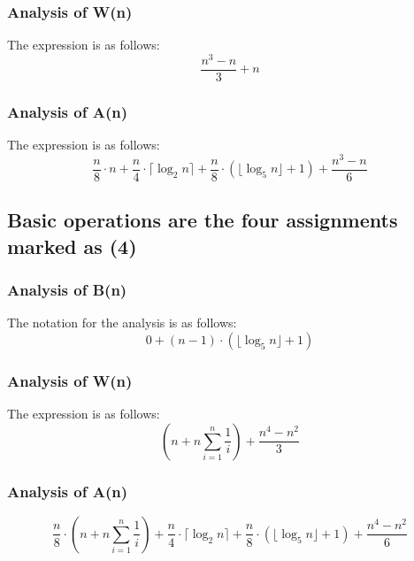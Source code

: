 \documentclass[11pt, oneside, a4paper]{article}
\begin{document}
	\subsubsection{Analysis of W(n)}
 \noindent The expression is as follows:
\begin{equation*}
\frac{n^3 - n}{3} + n
\end{equation*}

        \subsubsection{Analysis of A(n)}
        \noindent The expression is as follows:
\begin{equation*}
\frac{n}{8} \cdot n + \frac{n}{4} \cdot \lceil \log_2 n \rceil + \frac{n}{8} \cdot \left( \lfloor \log_5 n \rfloor + 1 \right) + \frac{n^3 - n}{6}
\end{equation*}


	\subsection{Basic operations are the four assignments marked as (4)}

	\subsubsection{Analysis of B(n)}
 \noindent The notation for the analysis is as follows:
\begin{equation*}
0 + (n-1) \cdot \left( \lfloor \log_5 n \rfloor + 1 \right)
\end{equation*}

	\subsubsection{Analysis of W(n)}
 \noindent The expression is as follows:
\begin{equation*}
\left( n + n \sum_{i=1}^{n} \frac{1}{i} \right) + \frac{n^4 - n^2}{3}
\end{equation*}

	
        \subsubsection{Analysis of A(n)}
        \begin{equation*}
\frac{n}{8} \cdot ( n + n \sum_{i=1}^{n} \frac{1}{i} ) + \frac{n}{4} \cdot \lceil \log_2 n \rceil + \frac{n}{8} \cdot \left( \lfloor \log_5 n \rfloor + 1 \right) + \frac{n^4 - n^2}{6}
\end{equation*}
\end{document}
